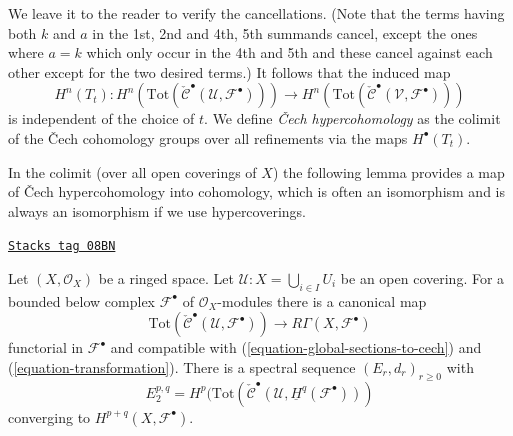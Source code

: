 We leave it to the reader to verify the cancellations. (Note that the
terms having both $k$ and $a$ in the 1st, 2nd and 4th, 5th summands
cancel, except the ones where $a = k$ which only occur in the 4th and 5th
and these cancel against each other except for the two desired terms.)
It follows that the induced map
$$
H^n(T_t) :
H^n(
\text{Tot}(\check{\mathcal{C}}^\bullet({\mathcal U}, {\mathcal F}^\bullet))
)
\to
H^n(
\text{Tot}(\check{\mathcal{C}}^\bullet({\mathcal V}, {\mathcal F}^\bullet))
)
$$
is independent of the choice of $t$. We define
{\it {\v C}ech hypercohomology} as the colimit of the
{\v C}ech cohomology groups
over all refinements via the maps $H^\bullet(T_t)$.

\medskip\noindent
In the colimit (over all open coverings of $X$) the following lemma provides
a map of {\v C}ech hypercohomology into cohomology, which is often an
isomorphism and is always an isomorphism if we use hypercoverings.

\begin{lemma}
\label{cohomology-lemma-cech-complex-complex}
\href{https://stacks.math.columbia.edu/tag/08BN}{\texttt{Stacks tag 08BN}}

Let $(X, \mathcal{O}_X)$ be a ringed space.
Let $\mathcal{U} : X = \bigcup_{i \in I} U_i$ be
an open covering. For a bounded below complex $\mathcal{F}^\bullet$
of $\mathcal{O}_X$-modules there is a canonical map
$$
\text{Tot}(\check{\mathcal{C}}^\bullet(\mathcal{U}, \mathcal{F}^\bullet))
\longrightarrow
R\Gamma(X, \mathcal{F}^\bullet)
$$
functorial in $\mathcal{F}^\bullet$ and compatible with
(\ref{equation-global-sections-to-cech}) and (\ref{equation-transformation}).
There is a spectral sequence $(E_r, d_r)_{r \geq 0}$ with
$$
E_2^{p, q} =
H^p(\text{Tot}(\check{\mathcal{C}}^\bullet(\mathcal{U},
\underline{H}^q(\mathcal{F}^\bullet)))
$$
converging to $H^{p + q}(X, \mathcal{F}^\bullet)$.
\end{lemma}

